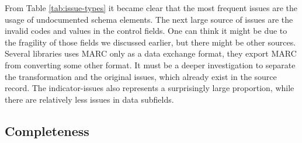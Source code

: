 From Table \ref{tab:issue-types} it became clear that the most frequent issues are the usage of undocumented schema elements. The next large source of issues are the invalid codes and values in the control fields. One can think it might be due to the fragility of those fields we discussed earlier, but there might be other sources. Several libraries uses MARC only as a data exchange format, they export MARC from converting some other format. It must be a deeper investigation to separate the transformation and the original issues, which already exist in the source record. The indicator-issues also represents a surprisingly large proportion, while there are relatively less issues in data subfields.   

\subsection{Completeness}

